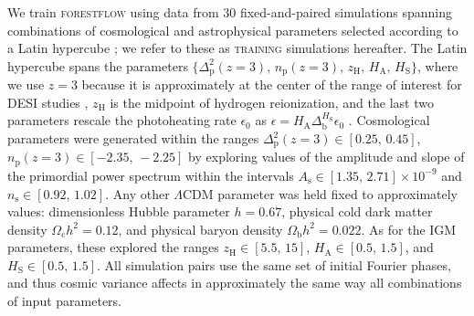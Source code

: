 \documentclass{aa}
\newcommand{\forestflow}{\textsc{forestflow}\xspace}
\newcommand{\lacehc}{\textsc{training}\xspace}
\begin{document}
We train \forestflow using data from 30 fixed-and-paired simulations spanning combinations of cosmological and astrophysical parameters selected according to a Latin hypercube \citep{mckay1979ComparisonThreeMethods}; we refer to these as \lacehc simulations hereafter. The Latin hypercube spans the parameters $\{\Delta^2_\mathrm{p}(z=3),\, n_\mathrm{p}(z=3),\, z_\mathrm{H},\, H_\mathrm{A},\, H_\mathrm{S}\}$, where we use $z=3$ because it is approximately at the center of the range of interest for DESI studies \citep{ravoux2023DarkEnergySpectroscopica, karacayli2024Optimal1DLy}, $z_\mathrm{H}$ is the midpoint of hydrogen reionization, and the last two parameters rescale the  photoheating rate $\epsilon_0$ as $\epsilon = H_\mathrm{A} \Delta_\mathrm{b}^{H_\mathrm{S}} \epsilon_0$ \citep{onorbe2017SelfconsistentModelingReionization}. Cosmological parameters were generated within the ranges $\Delta^2_\mathrm{p}(z=3) \in [0.25,\, 0.45]$, $n_\mathrm{p}(z=3) \in [-2.35,\, -2.25]$ by exploring values of the amplitude and slope of the primordial power spectrum within the intervals $A_\mathrm{s} \in [1.35,\, 2.71]\times 10^{-9}$ and $n_\mathrm{s} \in [0.92,\, 1.02]$. Any other $\Lambda$CDM parameter was held fixed to approximately \citet{planckcollaboration2020Planck2018Resultsa} values: dimensionless Hubble parameter $h=0.67$, physical cold dark matter density $\Omega_\mathrm{c} h^2=0.12$, and physical baryon density $\Omega_\mathrm{b} h^2=0.022$. As for the IGM parameters, these explored the ranges $z_\mathrm{H}\in[5.5,\,15]$, $H_\mathrm{A}\in[0.5,\,1.5]$, and $H_\mathrm{S}\in[0.5,\,1.5]$. All simulation pairs use the same set of initial Fourier phases, and thus cosmic variance affects in approximately the same way all combinations of input parameters.
\end{document}
